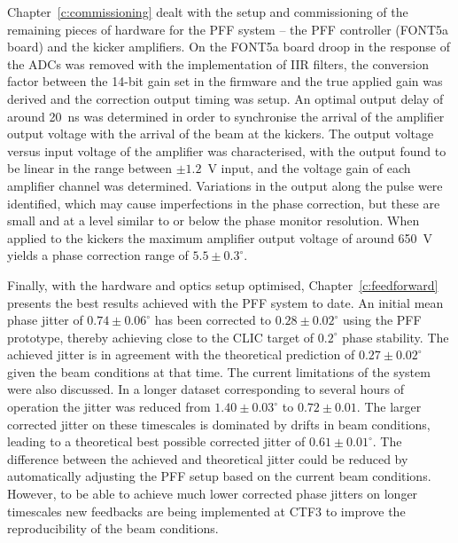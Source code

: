 Chapter~\ref{c:commissioning} dealt with the setup and commissioning of the remaining pieces of hardware for the PFF system -- the PFF controller (FONT5a board) and the kicker amplifiers. On the FONT5a board droop in the response of the ADCs was removed with the implementation of IIR filters, the conversion factor between the 14-bit gain set in the firmware and the true applied gain was derived and the correction output timing was setup. An optimal output delay of around 20~ns was determined in order to synchronise the arrival of the amplifier output voltage with the arrival of the beam  at the kickers. The output voltage versus input voltage of the amplifier was characterised, with the output found to be linear in the range between \(\pm1.2\)~V input, and the voltage gain of each amplifier channel was determined. Variations in the output along the pulse were identified, which may cause imperfections in the phase correction, but these are small and at a level similar to or below the phase monitor resolution. When applied to the kickers the maximum amplifier output voltage of around 650~V yields a phase correction range of \(5.5\pm0.3^\circ\).

Finally, with the hardware and optics setup optimised, Chapter~\ref{c:feedforward} presents the best results achieved with the PFF system to date. An initial mean phase jitter of \(0.74\pm0.06^\circ\) has been corrected to \(0.28\pm0.02^\circ\) using the PFF prototype, thereby achieving close to the CLIC target of \(0.2^\circ\) phase stability. The achieved jitter is in agreement with the theoretical prediction of \(0.27\pm0.02^\circ\) given the beam conditions at that time. The current limitations of the system were also discussed. In a longer dataset corresponding to several hours of operation the jitter was reduced from \(1.40\pm0.03^\circ\) to \(0.72\pm0.01\). The larger corrected jitter on these timescales is dominated by drifts in beam conditions, leading to a theoretical best possible corrected jitter of \(0.61\pm0.01^\circ\). The difference between the achieved and theoretical jitter could be reduced by automatically adjusting the PFF setup based on the current beam conditions. However, to be able to achieve much lower corrected phase jitters on longer timescales new feedbacks are being implemented at CTF3 to improve the reproducibility of the beam conditions. 


